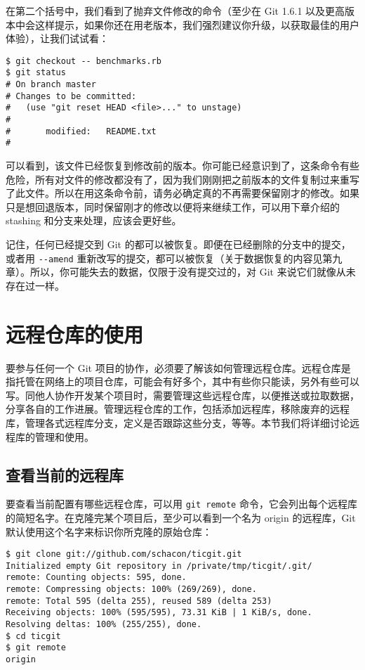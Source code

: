 \documentclass[a4paper]{book}
\begin{document}
在第二个括号中，我们看到了抛弃文件修改的命令（至少在 Git 1.6.1 以及更高版本中会这样提示，如果你还在用老版本，我们强烈建议你升级，以获取最佳的用户体验），让我们试试看：

\begin{shaded}\begin{verbatim}
$ git checkout -- benchmarks.rb
$ git status
# On branch master
# Changes to be committed:
#   (use "git reset HEAD <file>..." to unstage)
#
#       modified:   README.txt
#
\end{verbatim}\end{shaded}

可以看到，该文件已经恢复到修改前的版本。你可能已经意识到了，这条命令有些危险，所有对文件的修改都没有了，因为我们刚刚把之前版本的文件复制过来重写了此文件。所以在用这条命令前，请务必确定真的不再需要保留刚才的修改。如果只是想回退版本，同时保留刚才的修改以便将来继续工作，可以用下章介绍的 stashing 和分支来处理，应该会更好些。

记住，任何已经提交到 Git 的都可以被恢复。即便在已经删除的分支中的提交，或者用 \texttt{-{}-amend} 重新改写的提交，都可以被恢复（关于数据恢复的内容见第九章）。所以，你可能失去的数据，仅限于没有提交过的，对 Git 来说它们就像从未存在过一样。

\section{远程仓库的使用}

要参与任何一个 Git 项目的协作，必须要了解该如何管理远程仓库。远程仓库是指托管在网络上的项目仓库，可能会有好多个，其中有些你只能读，另外有些可以写。同他人协作开发某个项目时，需要管理这些远程仓库，以便推送或拉取数据，分享各自的工作进展。管理远程仓库的工作，包括添加远程库，移除废弃的远程库，管理各式远程库分支，定义是否跟踪这些分支，等等。本节我们将详细讨论远程库的管理和使用。

\subsection{查看当前的远程库}

要查看当前配置有哪些远程仓库，可以用 \texttt{git remote} 命令，它会列出每个远程库的简短名字。在克隆完某个项目后，至少可以看到一个名为 origin 的远程库，Git 默认使用这个名字来标识你所克隆的原始仓库：

\begin{shaded}\begin{verbatim}
$ git clone git://github.com/schacon/ticgit.git
Initialized empty Git repository in /private/tmp/ticgit/.git/
remote: Counting objects: 595, done.
remote: Compressing objects: 100% (269/269), done.
remote: Total 595 (delta 255), reused 589 (delta 253)
Receiving objects: 100% (595/595), 73.31 KiB | 1 KiB/s, done.
Resolving deltas: 100% (255/255), done.
$ cd ticgit
$ git remote
origin
\end{verbatim}\end{shaded}
\end{document}

